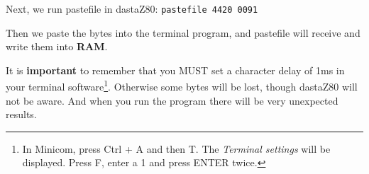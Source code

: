     Next, we run pastefile in dastaZ80: \texttt{pastefile 4420 0091}

    Then we paste the bytes into the terminal program, and pastefile will
    receive and write them into \textbf{RAM}.

    It is \textbf{important} to remember that you MUST set a character delay of
    1ms in your terminal software\footnote{In Minicom, press Ctrl + A and then
    T. The \textit{Terminal settings} will be displayed. Press F, enter a 1 and
    press ENTER twice.}. Otherwise some bytes will be lost, though
    dastaZ80 will not be aware. And when you run the program there will be very
    unexpected results.






